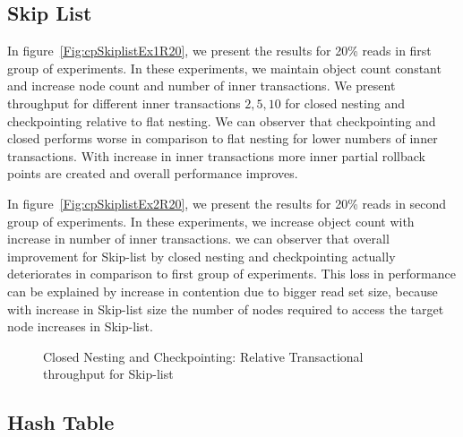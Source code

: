 \documentclass[12pt,english]{report}
\begin{document}
\subsection{Skip List}
In figure~\ref{Fig:cpSkiplistEx1R20}, we present the results for 20\% reads in first group of experiments. In these experiments, we maintain object count constant and increase node count and number of inner transactions. We present throughput for different inner transactions ${2, 5, 10}$ for closed nesting and checkpointing relative to flat nesting. We can observer that checkpointing and closed performs worse in comparison to flat nesting for lower numbers of inner transactions. With increase in inner transactions more inner partial rollback points are created and overall performance improves.

In figure~\ref{Fig:cpSkiplistEx2R20}, we present the results for 20\% reads in second group of experiments. In these experiments, we increase object count with increase in number of inner transactions. we can observer that overall improvement for Skip-list by closed nesting and checkpointing actually deteriorates in comparison to first group of experiments. This loss in performance can be explained by increase in contention due to bigger read set size, because with increase in Skip-list size the number of nodes required to access the target node increases in Skip-list.

\begin{figure}[H]
\centering
{}
\end{figure}
\begin{figure}[H]
\centering
{}
\end{figure}
\begin{figure}[H]
\centering
{}
\caption{Closed Nesting and Checkpointing: Relative Transactional throughput for Skip-list}
\label{Fig:cpSkiplist}
\end{figure}

\subsection{Hash Table}
\end{document}
